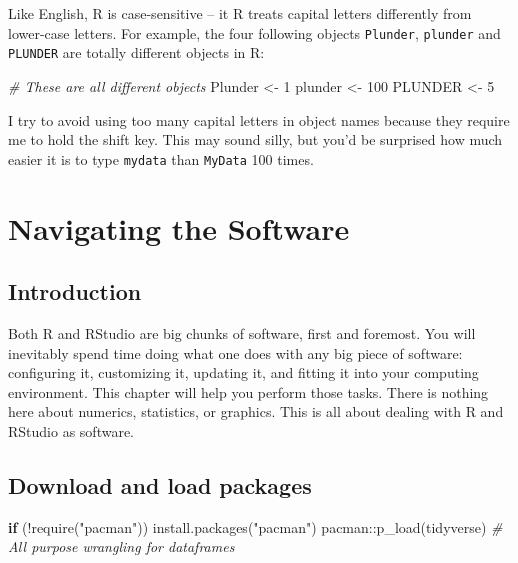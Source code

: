 \documentclass[
]{book}
\newenvironment{Shaded}{\begin{snugshade}}{\end{snugshade}}
\newcommand{\CommentTok}[1]{\textcolor[rgb]{0.56,0.35,0.01}{\textit{#1}}}
\newcommand{\ControlFlowTok}[1]{\textcolor[rgb]{0.13,0.29,0.53}{\textbf{#1}}}
\newcommand{\DecValTok}[1]{\textcolor[rgb]{0.00,0.00,0.81}{#1}}
\newcommand{\FunctionTok}[1]{\textcolor[rgb]{0.00,0.00,0.00}{#1}}
\newcommand{\NormalTok}[1]{#1}
\newcommand{\OtherTok}[1]{\textcolor[rgb]{0.56,0.35,0.01}{#1}}
\newcommand{\SpecialCharTok}[1]{\textcolor[rgb]{0.00,0.00,0.00}{#1}}
\newcommand{\StringTok}[1]{\textcolor[rgb]{0.31,0.60,0.02}{#1}}
\begin{document}
Like English, R is case-sensitive -- it R treats capital letters differently from lower-case letters. For example, the four following objects \texttt{Plunder}, \texttt{plunder} and \texttt{PLUNDER} are totally different objects in R:

\begin{Shaded}
\begin{Highlighting}[]
\CommentTok{\# These are all different objects}
\NormalTok{Plunder }\OtherTok{\textless{}{-}} \DecValTok{1}
\NormalTok{plunder }\OtherTok{\textless{}{-}} \DecValTok{100}
\NormalTok{PLUNDER }\OtherTok{\textless{}{-}} \DecValTok{5}
\end{Highlighting}
\end{Shaded}

I try to avoid using too many capital letters in object names because they require me to hold the shift key. This may sound silly, but you'd be surprised how much easier it is to type \texttt{mydata} than \texttt{MyData} 100 times.

\hypertarget{NavigatingTheSoftware}{%
\chapter{Navigating the Software}\label{NavigatingTheSoftware}}

\hypertarget{introduction}{%
\section*{Introduction}\label{introduction}}

Both R and RStudio are big chunks of software, first and foremost. You will inevitably spend time doing what one does with any big piece of software: configuring it, customizing it, updating it, and fitting it into your computing environment. This chapter will help you perform those tasks. There is nothing here about numerics, statistics, or graphics. This is all about dealing with R and RStudio as software.

\hypertarget{download-and-load-packages-1}{%
\section*{Download and load packages}\label{download-and-load-packages-1}}

\begin{Shaded}
\begin{Highlighting}[]
\ControlFlowTok{if}\NormalTok{ (}\SpecialCharTok{!}\FunctionTok{require}\NormalTok{(}\StringTok{"pacman"}\NormalTok{)) }\FunctionTok{install.packages}\NormalTok{(}\StringTok{"pacman"}\NormalTok{)}
\NormalTok{pacman}\SpecialCharTok{::}\FunctionTok{p\_load}\NormalTok{(tidyverse) }\CommentTok{\# All purpose wrangling for dataframes}
\end{Highlighting}
\end{Shaded}
\end{document}
